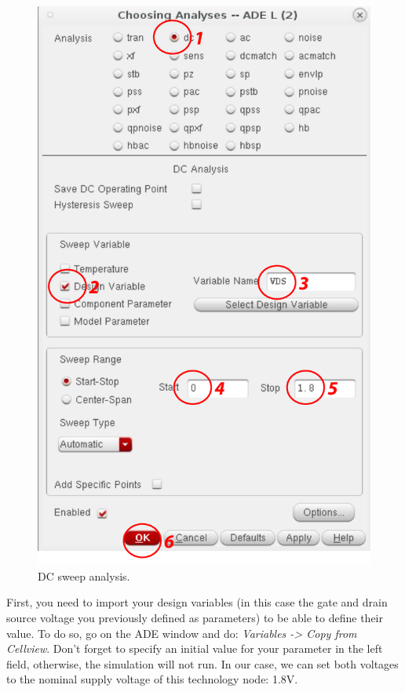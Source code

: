 \begin{enumerate}
	
	\parbox[t]{\dimexpr\textwidth-\leftmargin}{%
		\begin{figure}
			\vspace{-0mm}
			\centering
			\vspace{-\baselineskip}
			\includegraphics[scale=0.4]{figures/lab1_schematic_sim/dcsweep.pdf}
			\caption{DC sweep analysis.}
			\label{fig_dcsweep}
		\end{figure}
		\item First, you need to import your design variables (in this case the gate and drain source voltage you previously defined as parameters) to be able to define their value. To do so, go on the ADE window and do: \textit{Variables -> Copy from Cellview}. Don't forget to specify an initial value for your parameter in the left field, otherwise, the simulation will not run. In our case, we can set both voltages to the nominal supply voltage of this technology node: 1.8V.
}
\end{enumerate}
